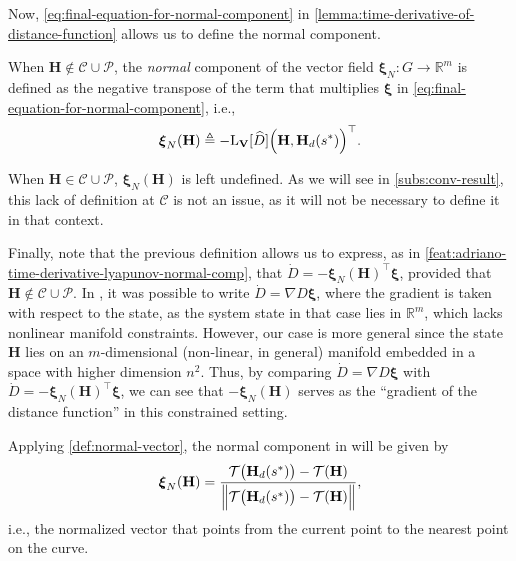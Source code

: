 Now, \eqref{eq:final-equation-for-normal-component} in \cref{lemma:time-derivative-of-distance-function} allows us to define the normal component. 
\begin{definition}  \label{def:normal-vector}
    When $\mathbf{H} \not \in \mathcal{C} \cup \mathcal{P}$, the \emph{normal} component of the vector field $\boldsymbol{\xi}_N: G\to\mathbb{R}^m$ is defined as the negative transpose of the term that multiplies $\boldsymbol{\xi}$ in \eqref{eq:final-equation-for-normal-component}, i.e., 
    \begin{align}
        \boldsymbol{\xi}_N(\mathbf{H}) \triangleq -\text{L}_{\mathbf{V}}[\widehat{D}]\Bigl(\mathbf{H}, \mathbf{H}_d(s^*)\Bigr)^{\top}.
    \end{align}
\end{definition}
When $\mathbf{H} \in \mathcal{C} \cup \mathcal{P}$, $\boldsymbol{\xi}_N(\mathbf{H})$ is left undefined. As we will see in \cref{subs:conv-result}, this lack of definition at $\mathcal{C}$ is not an issue, as it will not be necessary to define it in that context. 

Finally, note that the previous definition allows us to express, as in \cref{feat:adriano-time-derivative-lyapunov-normal-comp}, that $\dot{D} = -\boldsymbol{\xi}_N(\mathbf{H})^{\top}\boldsymbol{\xi}$, provided that $\mathbf{H} \not \in \mathcal{C} \cup \mathcal{P}$. In \citet{Rezende2022}, it was possible to write $\dot{D} = \nabla D \boldsymbol{\xi}$, where the gradient is taken with respect to the state, as the system state in that case lies in $\mathbb{R}^m$, which lacks nonlinear manifold constraints. However, our case is more general since the state $\mathbf{H}$ lies on an $m$-dimensional (non-linear, in general) manifold embedded in a space with higher dimension $n^2$. Thus, by comparing $\dot{D} = \nabla D \boldsymbol{\xi}$ with $\dot{D} = -\boldsymbol{\xi}_N(\mathbf{H})^{\top}\boldsymbol{\xi}$, we can see that $-\boldsymbol{\xi}_N(\mathbf{H})$ serves as the ``gradient of the distance function'' in this constrained setting.

\begin{example}\label{example:xi_N_rezende}
    Applying \cref{def:normal-vector}, the normal component in \citet{Rezende2022} will be given by
    \begin{align*}
        \boldsymbol{\xi}_{N}(\mathbf{H})= \frac{\mathcal{T}\bigl(\mathbf{H}_d(s^*)\bigr) - \mathcal{T}(\mathbf{H})}{\Bigl\|\mathcal{T}\bigl(\mathbf{H}_d(s^*)\bigr) - \mathcal{T}(\mathbf{H})\Bigr\|},  
    \end{align*}
     i.e., the normalized vector that points from the current point to the nearest point on the curve.
\end{example}
